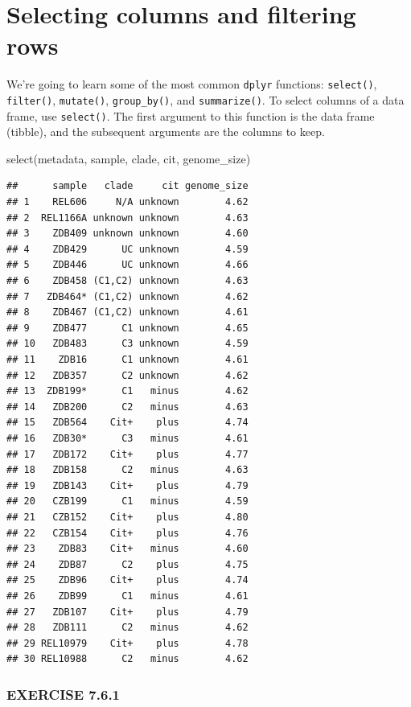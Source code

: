 \documentclass[
]{book}
\newenvironment{Shaded}{\begin{snugshade}}{\end{snugshade}}
\newcommand{\FunctionTok}[1]{\textcolor[rgb]{0.00,0.00,0.00}{#1}}
\newcommand{\NormalTok}[1]{#1}
\begin{document}
\hypertarget{selecting-columns-and-filtering-rows}{%
\section{Selecting columns and filtering rows}\label{selecting-columns-and-filtering-rows}}

We're going to learn some of the most common \texttt{dplyr} functions: \texttt{select()}, \texttt{filter()}, \texttt{mutate()}, \texttt{group\_by()}, and \texttt{summarize()}. To select columns of a data frame, use \texttt{select()}. The first argument to this function is the data frame (tibble), and the subsequent arguments are the columns to keep.

\begin{Shaded}
\begin{Highlighting}[]
\FunctionTok{select}\NormalTok{(metadata, sample, clade, cit, genome\_size)}
\end{Highlighting}
\end{Shaded}

\begin{verbatim}
##      sample   clade     cit genome_size
## 1    REL606     N/A unknown        4.62
## 2  REL1166A unknown unknown        4.63
## 3    ZDB409 unknown unknown        4.60
## 4    ZDB429      UC unknown        4.59
## 5    ZDB446      UC unknown        4.66
## 6    ZDB458 (C1,C2) unknown        4.63
## 7   ZDB464* (C1,C2) unknown        4.62
## 8    ZDB467 (C1,C2) unknown        4.61
## 9    ZDB477      C1 unknown        4.65
## 10   ZDB483      C3 unknown        4.59
## 11    ZDB16      C1 unknown        4.61
## 12   ZDB357      C2 unknown        4.62
## 13  ZDB199*      C1   minus        4.62
## 14   ZDB200      C2   minus        4.63
## 15   ZDB564    Cit+    plus        4.74
## 16   ZDB30*      C3   minus        4.61
## 17   ZDB172    Cit+    plus        4.77
## 18   ZDB158      C2   minus        4.63
## 19   ZDB143    Cit+    plus        4.79
## 20   CZB199      C1   minus        4.59
## 21   CZB152    Cit+    plus        4.80
## 22   CZB154    Cit+    plus        4.76
## 23    ZDB83    Cit+   minus        4.60
## 24    ZDB87      C2    plus        4.75
## 25    ZDB96    Cit+    plus        4.74
## 26    ZDB99      C1   minus        4.61
## 27   ZDB107    Cit+    plus        4.79
## 28   ZDB111      C2   minus        4.62
## 29 REL10979    Cit+    plus        4.78
## 30 REL10988      C2   minus        4.62
\end{verbatim}

\hypertarget{exercise-7.6.1}{%
\subsubsection*{EXERCISE 7.6.1}\label{exercise-7.6.1}}
\end{document}
